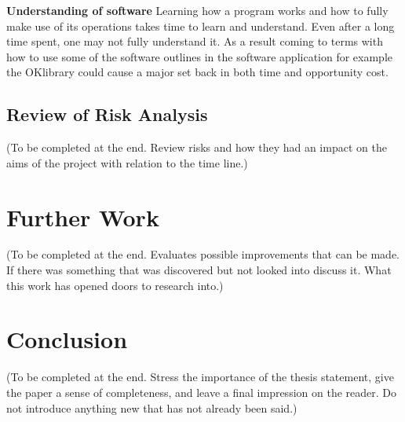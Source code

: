 \documentclass[11pt,a4paper, notitlepage]{report}
\begin{document}
\textbf{Understanding of software}
Learning how a program works and how to fully make use of its operations takes time to learn and understand. Even after a long time spent, one may not fully understand it. As a result coming to terms with how to use some of the software outlines in the software application for example the OKlibrary could cause a major set back in both time and opportunity cost.

\subsection{Review of Risk Analysis}
\label{subsec:ReviewOfRA}

(To be completed at the end. Review risks and how they had an impact on the aims of the project with relation to the time line.)

\section{Further Work}
\label{sec:FurtherWork}

(To be completed at the end. Evaluates possible improvements that can be made. If there was something that was discovered but not looked into discuss it. What this work has opened doors to research into.)

\section{Conclusion}
\label{sec:Conclusion}

(To be completed at the end. Stress the importance of the thesis statement, give the paper a sense of completeness, and
leave a final impression on the reader. Do not introduce anything new that has not already been said.)



\nocite{*}

\end{document}
